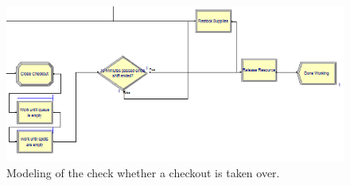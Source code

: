 \begin{figure}[]
\begin{center}
	\includegraphics[scale=1]{images/model-description/close-restock-release.PNG}
	\caption{Modeling of the check whether a checkout is taken over.}
	\label{fig:closerestockandrelease}
\end{center}
\end{figure}